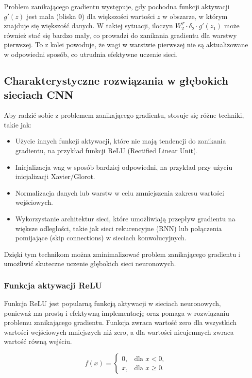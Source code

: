 \documentclass[12pt,twoside]{article}
\begin{document}
Problem zanikającego gradientu występuje, gdy pochodna funkcji aktywacji $g'(z)$ jest mała (bliska 0) dla większości wartości $z$ w obszarze, w którym znajduje się większość danych. W takiej sytuacji, iloczyn $W_2^T \cdot \delta_2 \cdot g'(z_1)$ może również stać się bardzo mały, co prowadzi do zanikania gradientu dla warstwy pierwszej. To z kolei powoduje, że wagi w warstwie pierwszej nie są aktualizowane w odpowiedni sposób, co utrudnia efektywne uczenie sieci.

\subsection{Charakterystyczne  rozwiązania w głębokich sieciach CNN }

Aby radzić sobie z problemem zanikającego gradientu, stosuje się różne techniki, takie jak:

\begin{itemize}
	\item Użycie innych funkcji aktywacji, które nie mają tendencji do zanikania gradientu, na przykład funkcji ReLU (Rectified Linear Unit).
	\item Inicjalizacja wag w sposób bardziej odpowiedni, na przykład przy użyciu inicjalizacji Xavier/Glorot.
	\item Normalizacja danych lub warstw w celu zmniejszenia zakresu wartości wejściowych.
	\item Wykorzystanie architektur sieci, które umożliwiają przepływ gradientu na większe odległości, takie jak sieci rekurencyjne (RNN) lub połączenia pomijające (skip connections) w sieciach konwolucyjnych.

\end{itemize}

Dzięki tym technikom można zminimalizować problem zanikającego gradientu i umożliwić skuteczne uczenie głębokich sieci neuronowych.

\subsubsection{Funkcja aktywacji ReLU}

Funkcja ReLU jest popularną funkcją aktywacji w sieciach neuronowych, ponieważ ma prostą i efektywną implementację oraz pomaga w rozwiązaniu problemu zanikającego gradientu. Funkcja zwraca wartość zero dla wszystkich wartości wejściowych mniejszych niż zero, a dla wartości nieujemnych zwraca wartość równą wejściu.


$$
f(x) = \begin{cases}
0, & \text{dla } x < 0, \\
x, & \text{dla } x \geq 0.
\end{cases}
$$
\end{document}
